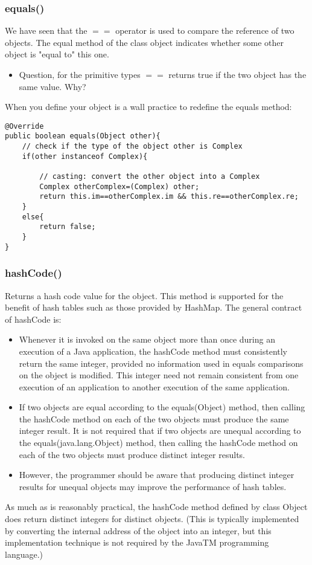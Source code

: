\documentclass{article}
\begin{document}
\subsubsection{equals()}
We have seen that the $==$ operator is used to compare the reference of two objects. The equal method of the class object indicates whether some other object is "equal to" this one. 
\begin{itemize}
\item Question, for the primitive types $==$ returns true  if the two object has the same value. Why?
\end{itemize}

When you define your object is a wall practice to redefine the equals method:
\begin{lstlisting}
@Override
public boolean equals(Object other){
    // check if the type of the object other is Complex
    if(other instanceof Complex){
    
        // casting: convert the other object into a Complex
        Complex otherComplex=(Complex) other;
        return this.im==otherComplex.im && this.re==otherComplex.re;
    }
    else{
        return false;
    }
}
\end{lstlisting}

\subsubsection{hashCode()}
Returns a hash code value for the object. This method is supported for the benefit of hash tables such as those provided by HashMap.
The general contract of hashCode is:
\begin{itemize}
\item Whenever it is invoked on the same object more than once during an execution of a Java application, the hashCode method must consistently return the same integer, provided no information used in equals comparisons on the object is modified. This integer need not remain consistent from one execution of an application to another execution of the same application.
\item If two objects are equal according to the equals(Object) method, then calling the hashCode method on each of the two objects must produce the same integer result.
It is not required that if two objects are unequal according to the equals(java.lang.Object) method, then calling the hashCode method on each of the two objects must produce distinct integer results. 
\item However, the programmer should be aware that producing distinct integer results for unequal objects may improve the performance of hash tables.
\end{itemize}
As much as is reasonably practical, the hashCode method defined by class Object does return distinct integers for distinct objects. (This is typically implemented by converting the internal address of the object into an integer, but this implementation technique is not required by the JavaTM programming language.)
\end{document}
